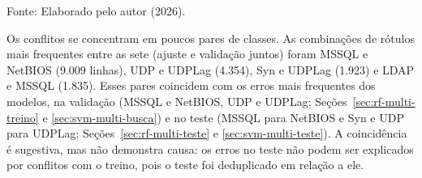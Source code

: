 \documentclass[
    12pt,                %
    openright,           %
    oneside,             %
    a4paper,             %
    english,             %
    brazil               %
]{abntex2}
\begin{document}
\begin{table}
\centering
\caption{Registros em conflito de rótulo por classe: 13 classes e 7 classes}
\label{tab:conflito7-classe}
\footnotesize
{}
\par\smallskip
Fonte: Elaborado pelo autor (2026).
\end{table}
 
Os conflitos se concentram em poucos pares de classes. As combinações de rótulos mais frequentes entre as sete (ajuste e validação juntos) foram MSSQL e NetBIOS (9.009 linhas), UDP e UDPLag (4.354), Syn e UDPLag (1.923) e LDAP e MSSQL (1.835). Esses pares coincidem com os erros mais frequentes dos modelos, na validação (MSSQL e NetBIOS, UDP e UDPLag; Seções~\ref{sec:rf-multi-treino} e \ref{sec:svm-multi-busca}) e no teste (MSSQL para NetBIOS e Syn e UDP para UDPLag; Seções~\ref{sec:rf-multi-teste} e \ref{sec:svm-multi-teste}). A coincidência é sugestiva, mas não demonstra causa: os erros no teste não podem ser explicados por conflitos com o treino, pois o teste foi deduplicado em relação a ele.
 
\end{document}
